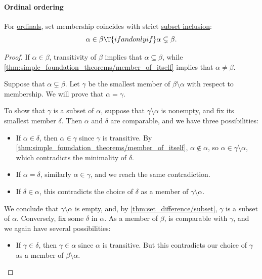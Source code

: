 \paragraph{Ordinal ordering}

\begin{proposition}\label{thm:ordinal_subset_inclusion}
  For \hyperref[def:ordinal]{ordinals}, set membership coincides with strict \hyperref[def:inclusion_order]{subset inclusion}:
  \begin{equation*}
    \alpha \in \beta \T{if and only if} \alpha \subsetneq \beta.
  \end{equation*}
\end{proposition}
\begin{proof}
  \SufficiencySubProof If \( \alpha \in \beta \), transitivity of \( \beta \) implies that \( \alpha \subseteq \beta \), while \cref{thm:simple_foundation_theorems/member_of_itself} implies that \( \alpha \neq \beta \).

  \NecessitySubProof{} Suppose that \( \alpha \subsetneq \beta \). Let \( \gamma \) be the smallest member of \( \beta \setminus \alpha \) with respect to membership. We will prove that \( \alpha = \gamma \).

  To show that \( \gamma \) is a subset of \( \alpha \), suppose that \( \gamma \setminus \alpha \) is nonempty, and fix its smallest member \( \delta \). Then \( \alpha \) and \( \delta \) are comparable, and we have three possibilities:
  \begin{itemize}
    \item If \( \alpha \in \delta \), then \( \alpha \in \gamma \) since \( \gamma \) is transitive. By \cref{thm:simple_foundation_theorems/member_of_itself}, \( \alpha \not\in \alpha \), so \( \alpha \in \gamma \setminus \alpha \), which contradicts the minimality of \( \delta \).

    \item If \( \alpha = \delta \), similarly \( \alpha \in \gamma \), and we reach the same contradiction.

    \item If \( \delta \in \alpha \), this contradicts the choice of \( \delta \) as a member of \( \gamma \setminus \alpha \).
  \end{itemize}

  We conclude that \( \gamma \setminus \alpha \) is empty, and, by \cref{thm:set_difference/subset}, \( \gamma \) is a subset of \( \alpha \). Conversely, fix some \( \delta \) in \( \alpha \). As a member of \( \beta \), is comparable with \( \gamma \), and we again have several possibilities:
  \begin{itemize}
    \item If \( \gamma \in \delta \), then \( \gamma \in \alpha \) since \( \alpha \) is transitive. But this contradicts our choice of \( \gamma \) as a member of \( \beta \setminus \alpha \).


\end{itemize}
\end{proof}
